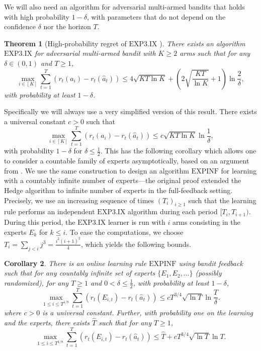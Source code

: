 \documentclass[aos]{imsart}
\theoremstyle{plain}
\newtheorem{theorem}{Theorem}[section]
\newtheorem{corollary}[theorem]{Corollary}
\theoremstyle{remark}
\newcommand{\1}{\mathbbm{1}}%
\newcommand{\EXPINF}{\mathrm{EXPINF}}
\newcommand{\EXPIX}{\mathrm{EXP3.IX}}
\begin{document}
We will also need an algorithm for adversarial multi-armed bandits that holds with high probability $1-\delta$, with parameters that do not depend on the confidence $\delta$ nor the horizon $T$.

\begin{theorem}[High-probability regret of $\EXPIX$ \cite{neu2015explore}] \label{thm:multiarmed_bandits}
There exists an algorithm $\EXPIX$ for adversarial multi-armed bandit with $K\geq 2$ arms such that for any $\delta\in(0,1)$ and $T\geq 1$,
\begin{equation*}
    \max_{i\in[K]} \sum_{t=1}^T( r_t(a_i) - r_t(\hat a_t)) \leq 4\sqrt{KT\ln K} + \left(2\sqrt{\frac{KT}{\ln K}}+1\right)\ln \frac{2}{\delta},
\end{equation*}
with probability at least $1-\delta$.
\end{theorem}
Specifically we will always use a very simplified version of this result. There exists a universal constant $c>0$ such that 
\begin{equation*}
    \max_{i\in[K]} \sum_{t=1}^T( r_t(a_i) - r_t(\hat a_t)) \leq c\sqrt{KT\ln K}\ln \frac{1}{\delta},
\end{equation*}
with probability $1-\delta$ for $\delta\leq \frac{1}{2}$. This has the following corollary which allows one to consider a countable family of experts asymptotically, based on an argument from \citep*[Corollary 4]{hanneke:22a}. We use the same construction to design an algorithm $\EXPINF$ for learning with a countably infinite number of experts---the original proof extended the Hedge algorithm to infinite number of experts in the full-feedback setting. Precisely, we use an increasing sequence of times $(T_i)_{i\geq 1}$ such that the learning rule performs an independent $\EXPIX$ algorithm during each period $[T_i,T_{i+1})$. During this period, the $\EXPIX$ learner is run with $i$ arms consisting in the experts $E_k$ for $k\leq i$. To ease the computations, we choose $T_i = \sum_{j< i} j^3 = \frac{i^2(i+1)^2}{4}$, which yields the following bounds.

\begin{corollary}\label{cor:infinite-exp4}
There is an online learning rule 
$\EXPINF$ using bandit feedback
such that for any countably infinite set of experts $\{E_1,E_2,\ldots\}$ 
(possibly randomized), for any $T\geq 1$ and $0<\delta\leq \frac{1}{2}$, with probability at least $1-\delta$,
\begin{equation*}
\max_{1\leq i \leq T^{1/8}} \sum_{t=1}^{T} \left( r_t(E_{i,t}) - r_t(\hat{a}_t) \right) 
\leq cT^{3/4}\sqrt{\ln T}\ln\frac{T}{\delta}.
\end{equation*}
where $c>0$ is a universal constant. Further, with probability one on the learning and the experts, there exists $\hat T$ such that for any $T\geq 1$,
\begin{equation*}
    \max_{1\leq i \leq T^{1/8}} \sum_{t=1}^{T} \left( r_t(E_{i,t}) - r_t(\hat{a}_t) \right) 
\leq \hat T +  cT^{3/4}\sqrt{\ln T}\ln T.
\end{equation*}
\end{corollary}
\end{document}
